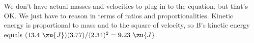         We don't have actual masses and velocities to plug in to   
        the equation, but that's OK. We just have to reason in terms
        of ratios and proportionalities. Kinetic energy is
        proportional to mass and to the square of velocity, so B's
        kinetic energy equals $(13.4\ \zu{J})(3.77)/(2.34)^2 = 9.23\ \zu{J}$.
